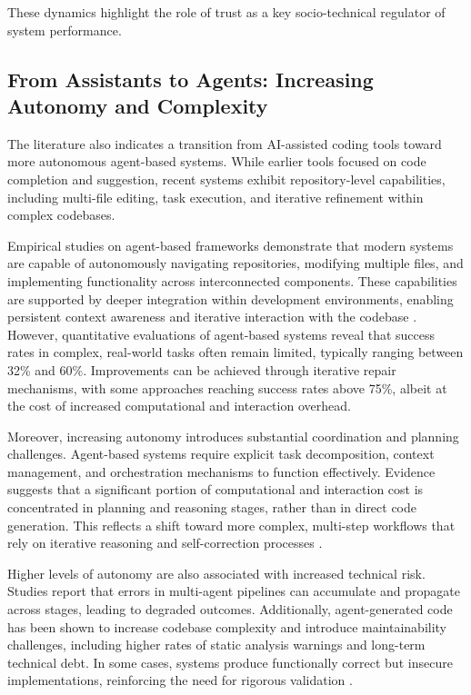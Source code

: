 \documentclass[conference]{IEEEtran}
\begin{document}
These dynamics highlight the role of trust as a key socio-technical regulator of system performance.

\subsection{From Assistants to Agents: Increasing Autonomy and Complexity}

The literature also indicates a transition from AI-assisted coding tools toward more autonomous agent-based systems. While earlier tools focused on code completion and suggestion, recent systems exhibit repository-level capabilities, including multi-file editing, task execution, and iterative refinement within complex codebases.

Empirical studies on agent-based frameworks demonstrate that modern systems are capable of autonomously navigating repositories, modifying multiple files, and implementing functionality across interconnected components. These capabilities are supported by deeper integration within development environments, enabling persistent context awareness and iterative interaction with the codebase \cite{chen_securevibebench_2026, yin_comprehensive_2025, he_speed_2026}. However, quantitative evaluations of agent-based systems reveal that success rates in complex, real-world tasks often remain limited, typically ranging between 32\% and 60\%. Improvements can be achieved through iterative repair mechanisms, with some approaches reaching success rates above 75\%, albeit at the cost of increased computational and interaction overhead.

Moreover, increasing autonomy introduces substantial coordination and planning challenges. Agent-based systems require explicit task decomposition, context management, and orchestration mechanisms to function effectively. Evidence suggests that a significant portion of computational and interaction cost is concentrated in planning and reasoning stages, rather than in direct code generation. This reflects a shift toward more complex, multi-step workflows that rely on iterative reasoning and self-correction processes \cite{liu_e2edev_2026, yin_comprehensive_2025, gong_how_2025}.

Higher levels of autonomy are also associated with increased technical risk. Studies report that errors in multi-agent pipelines can accumulate and propagate across stages, leading to degraded outcomes. Additionally, agent-generated code has been shown to increase codebase complexity and introduce maintainability challenges, including higher rates of static analysis warnings and long-term technical debt. In some cases, systems produce functionally correct but insecure implementations, reinforcing the need for rigorous validation \cite{liu_e2edev_2026, he_speed_2026, chen_securevibebench_2026}.
\end{document}
